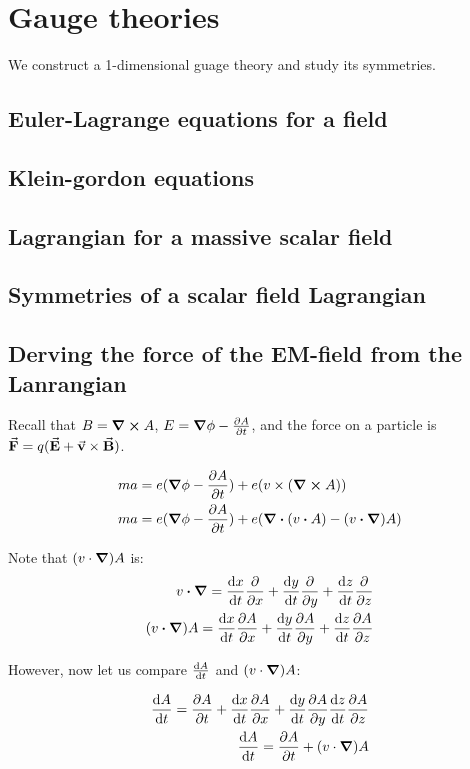 \chapter{Gauge theories}
We construct a 1-dimensional guage theory and study its symmetries.

\section{Euler-Lagrange equations for a field}
\section{Klein-gordon equations}
\section{Lagrangian for a massive scalar field}
\section{Symmetries of a scalar field Lagrangian}
\section{Derving the force of the EM-field from the Lanrangian}

Recall that $B = \curl A$, $E = \grad \phi - \pdv{A}{t}$, and the force
on a particle is $\va F = q (\va E + \va v \times \va B)$.

\begin{align*}
ma &= e (\grad \phi - \pdv{A}{t}) + e (v \times (\curl A)) \\
ma &= e (\grad \phi - \pdv{A}{t}) + e (\div (v \vdot A) - (v \vdot \grad) A)
\end{align*}

Note that $(v \cdot \grad) A$ is:
\begin{align*}
v \vdot \grad = \dv{x}{t} \pdv{x} + \dv{y}{t} \pdv{y} + \dv{z}{t} \pdv{z} \\
(v \vdot \grad) A = \dv{x}{t} \pdv{A}{x} + \dv{y}{t} \pdv{A}{y} + \dv{z}{t} \pdv{A}{z} \\
\end{align*}

However, now let us compare $\dv{A}{t}$ and $(v \cdot \grad) A$:

\begin{align*}
\dv{A}{t} = \pdv{A}{t} + \dv{x}{t}\pdv{A}{x} + \dv{y}{t}\pdv{A}{y} \dv{z}{t}\pdv{A}{z} \\
\dv{A}{t} = \pdv{A}{t} + (v \cdot \grad) A
\end{align*}

